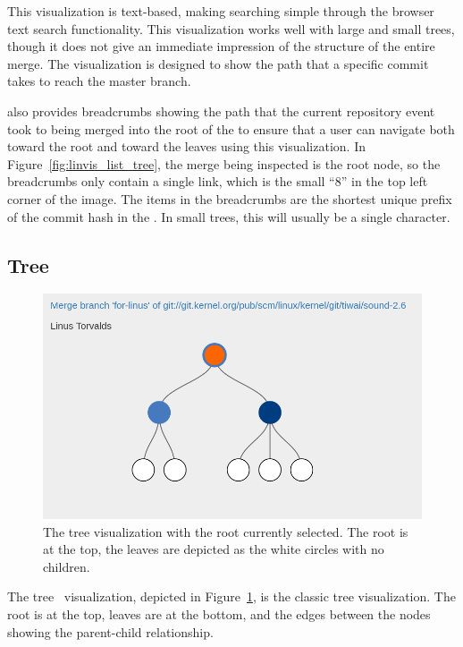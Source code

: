 This visualization is text-based, making
searching simple through the browser text search functionality.
This visualization works well with large and small trees, though it does
not give an immediate impression of the structure of the entire merge.
The visualization is designed to show the path that a specific commit
takes to reach the master branch.

\tool{} also provides breadcrumbs showing the path that the current
repository event took to being merged into the root of the \mt{} to
ensure that a user can navigate both toward the root and toward the
leaves using this visualization.
In Figure~\ref{fig:linvis_list_tree}, the merge being inspected is the
root node, so the breadcrumbs only contain a single link, which is the
small ``8'' in the top left corner of the image.
The items in the breadcrumbs are the shortest unique prefix of the
commit hash in the \mt{}.
In small trees, this will usually be a single character.

\subsection{\rt{} Tree}
\label{sub:rt_tree}

\begin{figure}[htpb]
  \centering
  \includegraphics[width=0.9\linewidth]{Figures/Linvis/linvis_reingold_tree.png}
  \caption{The \rt{} tree visualization with the root currently
    selected. The root is at the top, the leaves are depicted as the
    white circles with no children.}
  \label{fig:linvis_reingold_tree}
\end{figure}

The \rt{} tree~\cite{Reingold1981} visualization, depicted in
Figure~\ref{fig:linvis_reingold_tree}, is the classic tree
visualization. The root is at the top, leaves are at the bottom, and the
edges between the nodes showing the parent-child relationship.

